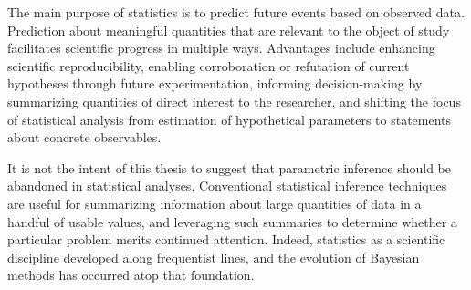 \documentclass[12pt, a4paper]{article}
\begin{document}
%
    The main purpose of statistics is to predict future events based on observed data.  Prediction about meaningful quantities that are relevant to the object of study facilitates scientific progress in multiple ways.  Advantages include enhancing scientific reproducibility, enabling corroboration or refutation of current hypotheses through future experimentation, informing decision-making by summarizing quantities of direct interest to the researcher, and shifting the focus of statistical analysis from estimation of hypothetical parameters to statements about concrete observables.

    It is not the intent of this thesis to suggest that parametric inference should be abandoned in statistical analyses.  Conventional statistical inference techniques are useful for summarizing information about large quantities of data in a handful of usable values, and leveraging such summaries to determine whether a particular problem merits continued attention.  Indeed, statistics as a scientific discipline developed along frequentist lines, and the evolution of Bayesian methods has occurred atop that foundation.
\end{document}
